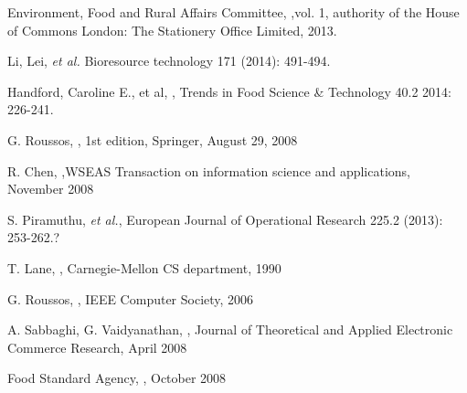 \documentclass[a4paper, 11pt]{article}
\begin{document}
\begin{thebibliography}{29}
Environment, Food and Rural Affairs Committee, \emph{},vol. 1, authority of the House of Commons London: The Stationery Office Limited, 2013.
\vspace{\baselineskip}

Li, Lei, \emph{et al.} \emph{} Bioresource technology 171 (2014): 491-494.
\vspace{\baselineskip}

Handford, Caroline E., et al, \emph{}, Trends in Food Science \& Technology 40.2 2014: 226-241.
\vspace{\baselineskip}

G. Roussos, \emph{}, 1st edition, Springer, August 29, 2008
\vspace{\baselineskip}

 R. Chen, \emph{},WSEAS Transaction on information science and applications, November 2008
\vspace{\baselineskip}

S. Piramuthu, \emph{et al.}, \emph{} European Journal of Operational Research 225.2 (2013): 253-262.?\vspace{\baselineskip}

T. Lane, \emph{}, Carnegie-Mellon CS department, 1990
\vspace{\baselineskip}

G. Roussos, \emph{}, IEEE Computer Society, 2006
\vspace{\baselineskip}

A. Sabbaghi, G. Vaidyanathan, \emph{}, Journal of Theoretical and Applied Electronic Commerce Research, April 2008

Food Standard Agency, \emph{}, October 2008
\vspace{\baselineskip}


\end{thebibliography}
\end{document}

